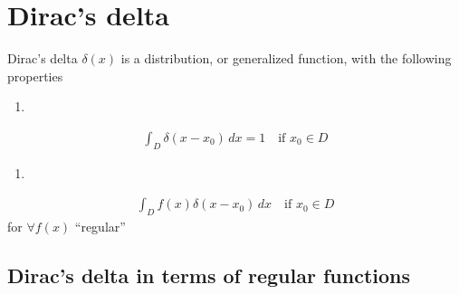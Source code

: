 \documentclass[letterpaper,10pt,english]{jupyterBook}
\begin{document}
\sphinxstepscope


\chapter{Dirac’s delta}
\label{\detokenize{ch/functional-analysis/dirac-delta:dirac-s-delta}}\label{\detokenize{ch/functional-analysis/dirac-delta:functional-analysis-dirac-delta}}\label{\detokenize{ch/functional-analysis/dirac-delta::doc}}
\sphinxAtStartPar
Dirac’s delta \(\delta(x)\) is a distribution, or generalized function, with the following properties
\begin{enumerate}
%
\item {} 
\end{enumerate}
\begin{equation}\label{equation:ch/functional-analysis/dirac-delta:dirac-delta:prop-1}
\begin{split}\int_{D} \delta(x-x_0) \, dx = 1  \quad \text{if $x_0 \in D$}\end{split}
\end{equation}\begin{enumerate}
%
\setcounter{enumi}{1}
\item {} 
\end{enumerate}
\begin{equation}\label{equation:ch/functional-analysis/dirac-delta:dirac-delta:prop-2}
\begin{split}\int_{D} f(x) \delta(x-x_0) \, dx \quad \text{if $x_0 \in D$}\end{split}
\end{equation}
\sphinxAtStartPar
for \(\forall f(x)\) “regular”  


\section{Dirac’s delta in terms of regular functions}
\label{\detokenize{ch/functional-analysis/dirac-delta:dirac-s-delta-in-terms-of-regular-functions}}\label{\detokenize{ch/functional-analysis/dirac-delta:functional-analysis-dirac-delta-approximations}}
\end{document}
